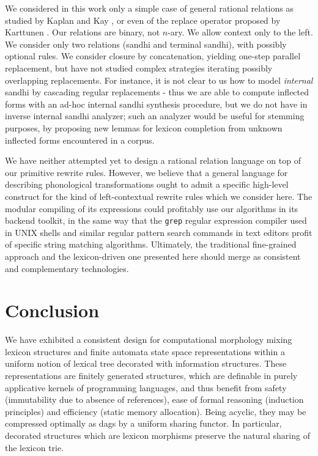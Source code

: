 \label{compar}
We considered in this work only a simple case of general rational relations 
as studied by Kaplan and Kay \cite{kk}, or even of the replace operator 
proposed by Karttunen \cite{karttunen2}. Our relations are binary, not $n$-ary.
We allow context only to the left. We consider only two relations 
(sandhi and terminal sandhi), with possibly optional rules. We consider
closure by concatenation, yielding one-step parallel replacement,
but have not studied complex strategies iterating possibly overlapping
replacements. For instance, it is not clear to us how to model {\sl internal}
sandhi by cascading regular replacements - 
thus we are able to compute inflected forms with an ad-hoc internal sandhi 
synthesis procedure, but we do not have in inverse internal sandhi analyzer;
such an analyzer would be useful for stemming purposes, by
proposing new lemmas for lexicon completion
from unknown inflected forms encountered in a corpus. 

We have neither attempted yet to design a rational relation language 
on top of our primitive rewrite rules. However, we believe that a general 
language for describing phonological transformations ought to admit a
specific high-level construct for the kind of left-contextual rewrite rules 
which we consider here. The modular compiling of its expressions
could profitably use our algorithms in its backend toolkit, in the same way
that the \verb:grep: regular expression compiler used in UNIX shells and
similar regular pattern search commands in text editors profit of
specific string matching algorithms. Ultimately, the traditional
fine-grained approach and the lexicon-driven one presented here should
merge as consistent and complementary technologies.

\section*{Conclusion}

We have exhibited a consistent design for computational morphology
mixing lexicon structures and finite automata state space
representations within a uniform notion of lexical tree decorated with 
information structures. These representations are finitely generated
structures, which are definable in purely applicative kernels of
programming languages, and thus benefit from safety (immutability due
to absence of references), ease of formal reasoning (induction principles)
and efficiency (static memory allocation). Being acyclic, they
may be compressed optimally as dags by a uniform sharing functor.
In particular, decorated structures which are lexicon morphisms preserve
the natural sharing of the lexicon trie.

